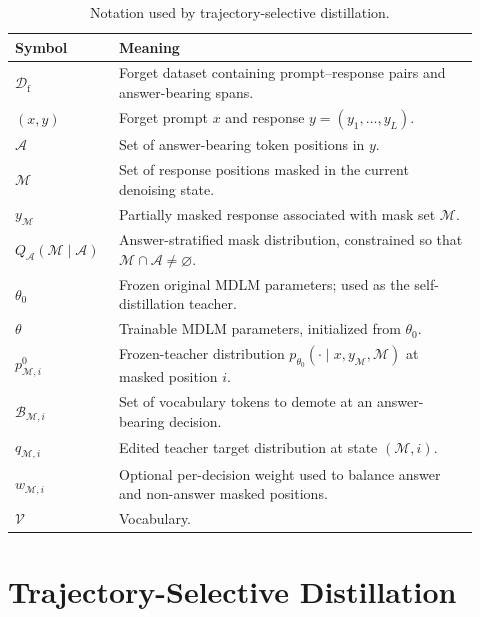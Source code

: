 \documentclass{article}
\newcommand{\Df}{\mathcal{D}_{\mathrm f}}
\newcommand{\V}{\mathcal{V}}
\newcommand{\Mset}{\mathcal{M}}
\newcommand{\Aset}{\mathcal{A}}
\newcommand{\Qans}{Q_{\Aset}}
\begin{document}
\begin{table}[t]
\centering
\caption{Notation used by trajectory-selective distillation.}
\label{tab:notation}
\small
\setlength{\tabcolsep}{5pt}
\renewcommand{\arraystretch}{1.15}
\begin{tabular}{>{\raggedright\arraybackslash}p{0.19\linewidth}
                >{\raggedright\arraybackslash}p{0.73\linewidth}}
\toprule
\textbf{Symbol} & \textbf{Meaning} \\
\midrule
$\Df$ & Forget dataset containing prompt--response pairs and answer-bearing spans. \\
$(x,y)$ & Forget prompt $x$ and response $y=(y_1,\ldots,y_L)$. \\
$\Aset$ & Set of answer-bearing token positions in $y$. \\
$\Mset$ & Set of response positions masked in the current denoising state. \\
$y_{\Mset}$ & Partially masked response associated with mask set $\Mset$. \\
$\Qans(\Mset\mid\Aset)$ & Answer-stratified mask distribution, constrained so that $\Mset\cap\Aset\neq\varnothing$. \\
$\theta_0$ & Frozen original MDLM parameters; used as the self-distillation teacher. \\
$\theta$ & Trainable MDLM parameters, initialized from $\theta_0$. \\
$p^0_{\Mset,i}$ & Frozen-teacher distribution $p_{\theta_0}(\cdot\mid x,y_{\Mset},\Mset)$ at masked position $i$. \\
$\mathcal{B}_{\Mset,i}$ & Set of vocabulary tokens to demote at an answer-bearing decision. \\
$q_{\Mset,i}$ & Edited teacher target distribution at state $(\Mset,i)$. \\
$w_{\Mset,i}$ & Optional per-decision weight used to balance answer and non-answer masked positions. \\
$\V$ & Vocabulary. \\
\bottomrule
\end{tabular}
\end{table}

\section{Trajectory-Selective Distillation}
\end{document}
